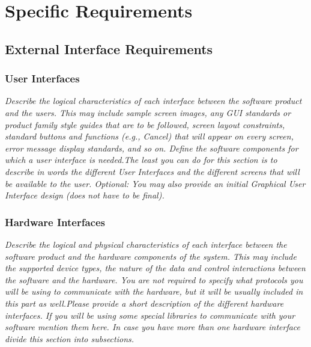 
\section{Specific Requirements}\label{sec:specific-requirements}
    \subsection{External Interface Requirements}\label{sec:external-interface-requirements}
        \subsubsection{User Interfaces}\label{sec:user-interfaces}
            \emph{Describe the logical characteristics of each interface between the software product and the users. This may include sample screen images, any GUI standards or product family style guides that are to be followed, screen layout constraints, standard buttons and functions (e.g., Cancel) that will appear on every screen, error message display standards, and so on. Define the software components for which a user interface is needed.\gnl The least you can do for this section is to describe in words the different User Interfaces and the different screens that will be available to the user. Optional: You may also provide an initial Graphical User Interface design (does not have to be final).}
        \subsubsection{Hardware Interfaces}\label{sec:hardware-interfaces}
            \emph{Describe the logical and physical characteristics of each interface between the software product and the hardware components of the system. This may include the supported device types, the nature of the data and control interactions between the software and the hardware. You are not required to specify what protocols you will be using to communicate with the hardware, but it will be usually included in this part as well.\gnl Please provide a short description of the different hardware interfaces. If you will be using some special libraries to communicate with your software mention them here. In case you have more than one hardware interface divide this section into subsections.}
